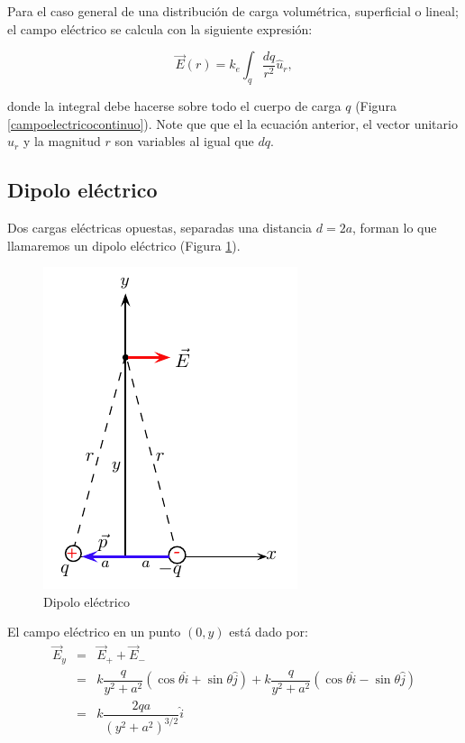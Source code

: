 Para el caso general de una distribución de carga volumétrica, superficial o lineal; el campo eléctrico se calcula con la siguiente expresión:

\begin{equation}
\vec{E}(r)=k_e\int_q \dfrac{dq}{r^2}\hat{u}_r,
\end{equation} 

donde la integral debe hacerse sobre todo el cuerpo de carga $q$ (Figura \ref{campoelectricocontinuo}). Note que que el la ecuación anterior, el vector unitario $\hat{u}_r$ y la magnitud $r$ son variables al igual que $dq$. 

\subsection*{Dipolo eléctrico}

Dos cargas eléctricas opuestas, separadas una distancia $d=2a$, forman lo que llamaremos un dipolo eléctrico (Figura \ref{dipolo}). 

\begin{figure}
\begin{center}
\includegraphics[scale=0.8]{electrostatica/dipolo}
\end{center}
\caption{Dipolo eléctrico}
\label{dipolo}
\end{figure}

El campo eléctrico en un punto $(0,y)$ está dado por:
\begin{eqnarray}
\nonumber
\vec{E}_{y}&=&\vec{E}_{+}+\vec{E}_{-}\\\nonumber
&=& k \dfrac{q}{y^2+a^2}(\cos\theta \hat{i}+\sin\theta \hat{j}) + k \dfrac{q}{y^2+a^2}(\cos\theta \hat{i}-\sin\theta \hat{j})\\
&=& k \dfrac{2qa}{(y^2+a^2)^{3/2}} \hat{i} 
\end{eqnarray}

